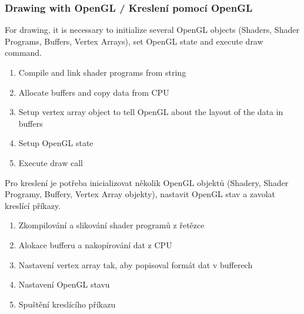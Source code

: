 \begin{frame}\frametitle{Drawing with OpenGL / Kreslení pomocí OpenGL}
\scriptsize
  For drawing, it is necessary to initialize several OpenGL objects (Shaders, Shader Programs, Buffers, Vertex Arrays), set OpenGL state and execute draw command.
  \begin{enumerate}
    \item Compile and link shader programs from string
    \item Allocate buffers and copy data from CPU
    \item Setup vertex array object to tell OpenGL about the layout of the data in buffers
    \item Setup OpenGL state
    \item Execute draw call
  \end{enumerate}

  Pro kreslení je potřeba inicializovat několik OpenGL objektů (Shadery, Shader Programy, Buffery, Vertex Array objekty), nastavit OpenGL stav a zavolat kreslící příkazy.
  \begin{enumerate}
    \item Zkompilování a slikování shader programů z řetězce
    \item Alokace bufferu a nakopírování dat z CPU
    \item Nastavení vertex array tak, aby popisoval formát dat v bufferech
    \item Nastavení OpenGL stavu
    \item Spuštění kreslícího příkazu
  \end{enumerate}
\end{frame}


